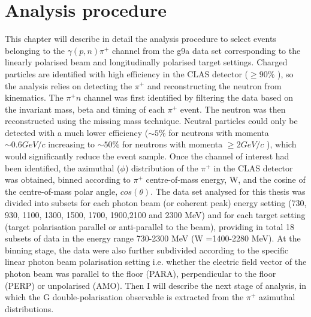 \section{Analysis procedure}
This chapter will describe in detail the analysis procedure to select events belonging to the $\gamma (p,n) \pi^+$ channel from the g9a data set corresponding to the linearly polarised beam and longitudinally polarised target settings.
Charged particles are identified with high efficiency in the CLAS detector ($\geq90\%$ \cite{Mecking2003}), so the analysis relies on detecting the $\pi^+$ and reconstructing the neutron from kinematics. The $\pi^+ n$ channel was first identified by filtering the data based on the invariant mass, beta and timing of each $\pi^+$ event. The neutron was then reconstructed using the missing mass technique. Neutral particles could only be detected with a much lower efficiency ($\sim5\%$ for neutrons with momenta $\sim 0.6 GeV/c$ increasing to $\sim 50\%$ for neutrons with momenta $\geq2 GeV/c$  \cite{Mecking2003}), which would significantly reduce the event sample. Once the channel of interest had been identified, the azimuthal ($\phi$) distribution of the $\pi^+$ in the CLAS detector was obtained, binned according to $\pi^+$ centre-of-mass energy, W, and the cosine of the centre-of-mass polar angle, $cos(\theta)$. The data set analysed for this thesis was divided into subsets for each photon beam (or coherent peak) energy setting (730, 930, 1100, 1300, 1500, 1700, 1900,2100 and 2300 MeV) and for each target setting (target polarisation parallel or anti-parallel to the beam), providing in total 18 subsets of data in the energy range 730-2300 MeV (W =1400-2280 MeV). At the binning stage, the data were  also further subdivided according to the specific linear photon beam polarisation setting i.e. whether the electric field vector of the photon beam was parallel to the floor (PARA), perpendicular to the floor (PERP) or unpolarised (AMO). Then I will describe the next stage of analysis, in which the G double-polarisation observable is extracted from the $\pi^+$ azimuthal distributions.

